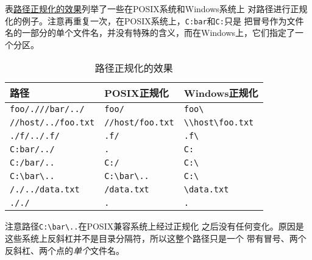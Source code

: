 表\hyperref[t20.1]{路径正规化的效果}列举了一些在POSIX系统和Windows系统上
对路径进行正规化的例子。注意再重复一次，在POSIX系统上，\texttt{C:bar}和\texttt{C:}只是
把冒号作为文件名的一部分的单个文件名，并没有特殊的含义，而在Windows上，它们指定了一个分区。
\begin{table}[htb]
    \centering
    \begin{tabular}{l|l|l}
        \hline
        \textbf{路径}                                    & \textbf{POSIX正规化}                              & \textbf{Windows正规化}                                               \\
        \hline
        \texttt{foo/.///bar/../}                       & \texttt{foo/}                                  & \texttt{foo\textbackslash}                                        \\
        \texttt{//host/../foo.txt}                     & \texttt{//host/foo.txt}                        & \texttt{\textbackslash \textbackslash host\textbackslash foo.txt} \\
        \texttt{./f/../.f/}                            & \texttt{.f/}                                   & \texttt{.f\textbackslash}                                         \\
        \texttt{C:bar/../}                             & \texttt{.}                                     & \texttt{C:}                                                       \\
        \texttt{C:/bar/..}                             & \texttt{C:/}                                   & \texttt{C:\textbackslash}                                         \\
        \texttt{C:\textbackslash bar\textbackslash ..} & \texttt{C:\textbackslash bar\textbackslash ..} & \texttt{C:\textbackslash}                                         \\
        \texttt{/./../data.txt}                        & \texttt{/data.txt}                             & \texttt{\textbackslash data.txt}                                  \\
        \texttt{././}                                  & \texttt{.}                                     & \texttt{.}                                                        \\
        \hline
    \end{tabular}
    \caption{路径正规化的效果}
    \label{t20.1}
\end{table}

注意路径\texttt{C:\textbackslash bar\textbackslash ..}在POSIX兼容系统上经过正规化
之后没有任何变化。原因是这些系统上反斜杠并不是目录分隔符，所以这整个路径只是一个
带有冒号、两个反斜杠、两个点的\emph{单个}文件名。

